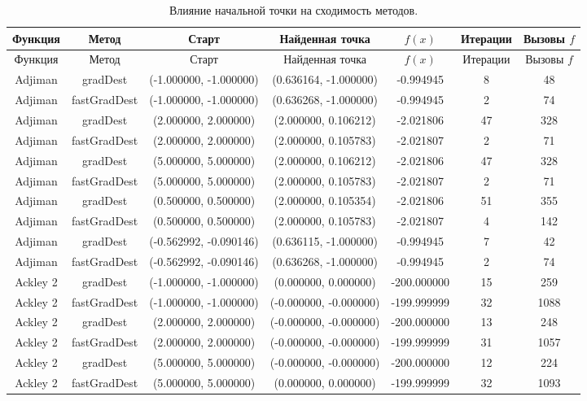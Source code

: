 \begin{longtable}{|c|c|c|c|c|c|c|}
\caption{Влияние начальной точки на сходимость методов.}\label{tab:starts}\\
\hline
Функция & Метод & Старт & Найденная точка & $f(x)$ & Итерации & Вызовы $f$ \\
\hline
\endfirsthead
\hline
Функция & Метод & Старт & Найденная точка & $f(x)$ & Итерации & Вызовы $f$ \\
\hline
\endhead
Adjiman & gradDest & (-1.000000, -1.000000) & (0.636164, -1.000000) & -0.994945 & 8 & 48 \\
Adjiman & fastGradDest & (-1.000000, -1.000000) & (0.636268, -1.000000) & -0.994945 & 2 & 74 \\
Adjiman & gradDest & (2.000000, 2.000000) & (2.000000, 0.106212) & -2.021806 & 47 & 328 \\
Adjiman & fastGradDest & (2.000000, 2.000000) & (2.000000, 0.105783) & -2.021807 & 2 & 71 \\
Adjiman & gradDest & (5.000000, 5.000000) & (2.000000, 0.106212) & -2.021806 & 47 & 328 \\
Adjiman & fastGradDest & (5.000000, 5.000000) & (2.000000, 0.105783) & -2.021807 & 2 & 71 \\
Adjiman & gradDest & (0.500000, 0.500000) & (2.000000, 0.105354) & -2.021806 & 51 & 355 \\
Adjiman & fastGradDest & (0.500000, 0.500000) & (2.000000, 0.105783) & -2.021807 & 4 & 142 \\
Adjiman & gradDest & (-0.562992, -0.090146) & (0.636115, -1.000000) & -0.994945 & 7 & 42 \\
Adjiman & fastGradDest & (-0.562992, -0.090146) & (0.636268, -1.000000) & -0.994945 & 2 & 74 \\
Ackley 2 & gradDest & (-1.000000, -1.000000) & (0.000000, 0.000000) & -200.000000 & 15 & 259 \\
Ackley 2 & fastGradDest & (-1.000000, -1.000000) & (-0.000000, -0.000000) & -199.999999 & 32 & 1088 \\
Ackley 2 & gradDest & (2.000000, 2.000000) & (-0.000000, -0.000000) & -200.000000 & 13 & 248 \\
Ackley 2 & fastGradDest & (2.000000, 2.000000) & (-0.000000, -0.000000) & -199.999999 & 31 & 1057 \\
Ackley 2 & gradDest & (5.000000, 5.000000) & (-0.000000, -0.000000) & -200.000000 & 12 & 224 \\
Ackley 2 & fastGradDest & (5.000000, 5.000000) & (0.000000, 0.000000) & -199.999999 & 32 & 1093 \\

\end{longtable}
